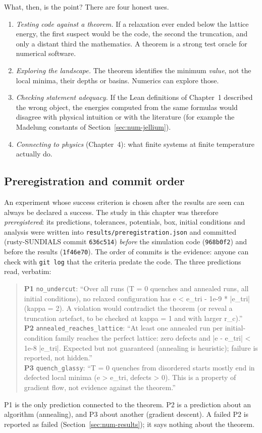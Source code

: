 What, then, is the point? There are four honest uses.
\begin{enumerate}
\item \emph{Testing code against a theorem.} If a relaxation ever ended below the lattice energy, the first suspect
would be the code, the second the truncation, and only a distant third the mathematics. A theorem is a strong test
oracle for numerical software.
\item \emph{Exploring the landscape.} The theorem identifies the minimum \emph{value}, not the local minima, their
depths or basins. Numerics can explore those.
\item \emph{Checking statement adequacy.} If the Lean definitions of Chapter~1 described the wrong object, the energies
computed from the same formulas would disagree with physical intuition or with the literature (for example the
Madelung constants of Section~\ref{sec:num-jellium}).
\item \emph{Connecting to physics} (Chapter~4): what finite systems at finite temperature actually do.
\end{enumerate}

\subsection{Preregistration and commit order}
An experiment whose success criterion is chosen after the results are seen can always be declared a success. The study
in this chapter was therefore \emph{preregistered}: its predictions, tolerances, potentials, box, initial conditions and
analysis were written into \texttt{results/preregistration.json} and committed (rusty-SUNDIALS commit
\texttt{636c514}) \emph{before} the simulation code (\texttt{968b0f2}) and before the results (\texttt{1f46e70}). The
order of commits is the evidence: anyone can check with \texttt{git log} that the criteria predate the code. The three
predictions read, verbatim:
\begin{quote}\small
\textbf{P1} \texttt{no\_undercut}: ``Over all runs (T = 0 quenches and annealed runs, all initial conditions), no
relaxed configuration has e < e\_tri - 1e-9 * |e\_tri| (kappa = 2). A violation would contradict the theorem (or reveal
a truncation artefact, to be checked at kappa = 1 and with larger r\_c).''\\[0.3em]
\textbf{P2} \texttt{annealed\_reaches\_lattice}: ``At least one annealed run per initial-condition family reaches the
perfect lattice: zero defects and |e - e\_tri| < 1e-8 |e\_tri|. Expected but not guaranteed (annealing is heuristic);
failure is reported, not hidden.''\\[0.3em]
\textbf{P3} \texttt{quench\_glassy}: ``T = 0 quenches from disordered starts mostly end in defected local minima (e >
e\_tri, defects > 0). This is a property of gradient flow, not evidence against the theorem.''
\end{quote}
P1 is the only prediction connected to the theorem. P2 is a prediction about an algorithm (annealing), and P3 about
another (gradient descent). A failed P2 is reported as failed (Section~\ref{sec:num-results}); it says nothing about the
theorem.

